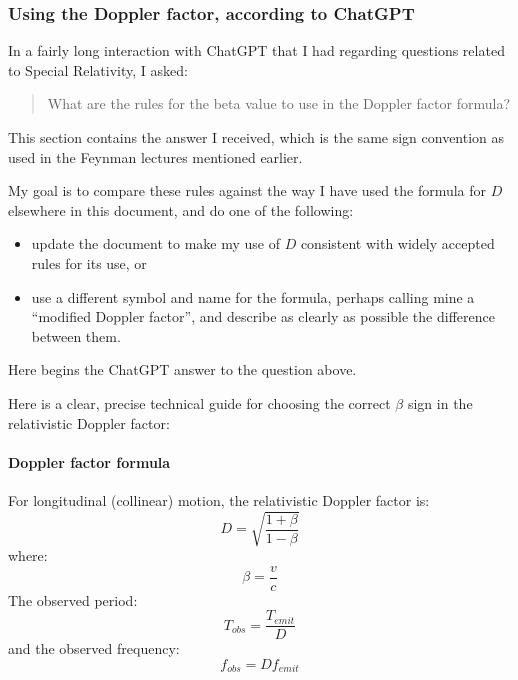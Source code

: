 \documentclass[a4paper]{article}
\theoremstyle{plain}
\theoremstyle{definition}
\begin{document}
\subsubsection{Using the Doppler factor, according to ChatGPT}
\label{sec:DopplerFactorSignRulesChatGPT}

In a fairly long interaction with ChatGPT that I had regarding
questions related to Special Relativity, I asked:
\begin{quote}
What are the rules for the beta value to use in the Doppler factor
formula?
\end{quote}
This section contains the answer I received, which is the same sign
convention as used in the Feynman lectures mentioned earlier.

My goal is to compare these rules against the way I have used the
formula for $D$ elsewhere in this document, and do one of the following:
\begin{itemize}
\item update the document to make my use of $D$ consistent with widely
  accepted rules for its use, or
\item use a different symbol and name for the formula, perhaps calling
  mine a ``modified Doppler factor'', and describe as clearly as
  possible the difference between them.
\end{itemize}

Here begins the ChatGPT answer to the question above.

Here is a clear, precise technical guide for choosing the correct
$\beta$ sign in the relativistic Doppler factor:

\paragraph{Doppler factor formula}

For longitudinal (collinear) motion, the relativistic Doppler factor is:
\begin{equation}
D = \sqrt{ \frac{1+\beta}{1-\beta} }
\end{equation}
where:
\begin{equation}
\beta = \frac{v}{c}
\end{equation}
The observed period:
\begin{equation}
T_{obs} = \frac{T_{emit}}{D}
\end{equation}
and the observed frequency:
\begin{equation}
f_{obs} = D f_{emit}
\end{equation}
\end{document}
